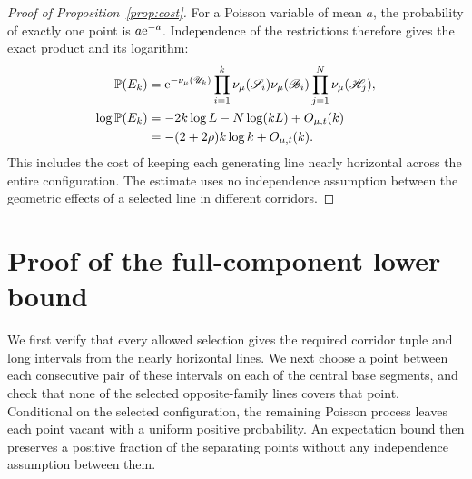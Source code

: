 \documentclass[11pt,letterpaper]{article}
\begin{document}
\begin{proof}[Proof of Proposition~\ref{prop:cost}]
For a Poisson variable of mean $a$, the probability of exactly one point is $a\mathrm{e}^{-a}$. Independence of the restrictions therefore gives the exact product and its logarithm:
\begin{equation}\label{eq:product}
\begin{aligned}
 \mathbb P(E_k)&=\mathrm{e}^{-\nu_\mu(\mathscr U_k)}
       \prod_{i=1}^k\nu_\mu(\mathscr S_i)\nu_\mu(\mathscr B_i)
       \prod_{j=1}^N\nu_\mu(\mathscr H_j),\\
 \log\mathbb P(E_k)&=-2k\log L-N\log(kL)+O_{\mu,t}(k)\\
             &=-(2+2\rho)k\log k+O_{\mu,t}(k).
\end{aligned}
\end{equation}
This includes the cost of keeping each generating line nearly horizontal across the entire configuration. The estimate uses no independence assumption between the geometric effects of a selected line in different corridors.
\end{proof}

\section{Proof of the full-component lower bound}

We first verify that every allowed selection gives the required corridor tuple and long intervals from the nearly horizontal lines. We next choose a point between each consecutive pair of these intervals on each of the central base segments, and check that none of the selected opposite-family lines covers that point. Conditional on the selected configuration, the remaining Poisson process leaves each point vacant with a uniform positive probability. An expectation bound then preserves a positive fraction of the separating points without any independence assumption between them.
\end{document}
